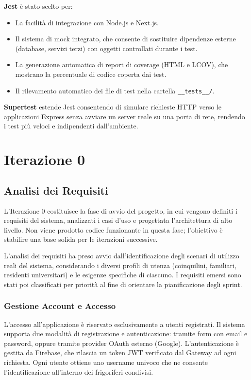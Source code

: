 \documentclass[12pt,a4paper,twoside]{report}
\begin{document}
\textbf{Jest} è stato scelto per:
\begin{itemize}
  \item La facilità di integrazione con Node.js e Next.js.
  \item Il sistema di mock integrato, che consente di sostituire dipendenze esterne (database, servizi terzi) con oggetti controllati durante i test.
  \item La generazione automatica di report di coverage (HTML e LCOV), che mostrano la percentuale di codice coperta dai test.
  \item Il rilevamento automatico dei file di test nella cartella \texttt{\_\_tests\_\_/}.
\end{itemize}

\textbf{Supertest} estende Jest consentendo di simulare richieste HTTP verso le applicazioni Express senza avviare un server reale su una porta di rete, rendendo i test più veloci e indipendenti dall'ambiente.

\chapter{Iterazione 0}

\section{Analisi dei Requisiti}

L'Iterazione 0 costituisce la fase di avvio del progetto, in cui vengono definiti i requisiti del sistema, analizzati i casi d'uso e progettata l'architettura di alto livello. Non viene prodotto codice funzionante in questa fase; l'obiettivo è stabilire una base solida per le iterazioni successive.

L'analisi dei requisiti ha preso avvio dall'identificazione degli scenari di utilizzo reali del sistema, considerando i diversi profili di utenza (coinquilini, familiari, residenti universitari) e le esigenze specifiche di ciascuno. I requisiti emersi sono stati poi classificati per priorità al fine di orientare la pianificazione degli sprint.

\subsection{Gestione Account e Accesso}

L'accesso all'applicazione è riservato esclusivamente a utenti registrati. Il sistema supporta due modalità di registrazione e autenticazione: tramite form con email e password, oppure tramite provider OAuth esterno (Google). L'autenticazione è gestita da Firebase, che rilascia un token JWT verificato dal Gateway ad ogni richiesta. Ogni utente ottiene uno username univoco che ne consente l'identificazione all'interno dei frigoriferi condivisi.
\end{document}
